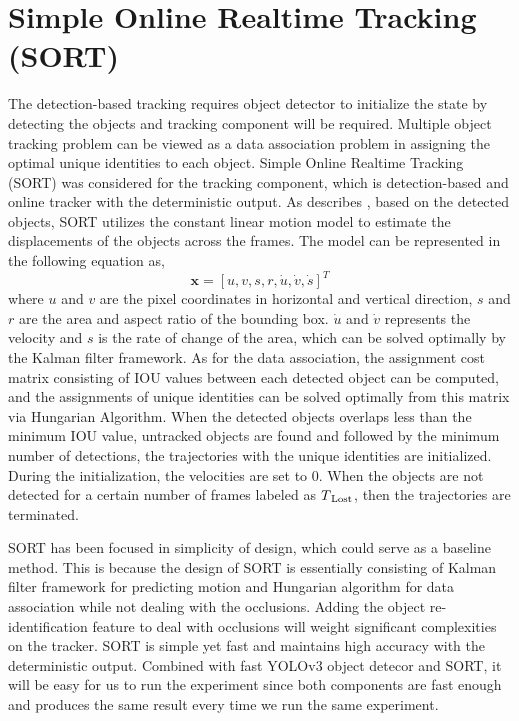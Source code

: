 \section{Simple Online Realtime Tracking (SORT)}
\label{sec:background/section_b}

The detection-based tracking requires object detector to initialize the state by detecting the objects and tracking component will be required. Multiple object tracking problem can be viewed as a data association problem in assigning the optimal unique identities to each object. Simple Online Realtime Tracking (SORT) was considered for the tracking component, which is detection-based and online tracker with the deterministic output. As \citeauthor{bewley_simple_2016} describes \cite{bewley_simple_2016}, based on the detected objects, SORT utilizes the constant linear motion model to estimate the displacements of the objects across the frames. The model can be represented in the following equation as,
\begin{equation}
\textbf{x} = [u, v, s, r, \dot{u}, \dot{v}, \dot{s}]^T
\label{eq:SORT_model}
\end{equation}
where $u$ and $v$ are the pixel coordinates in horizontal and vertical direction, $s$ and $r$ are the area and aspect ratio of the bounding box. $\dot{u}$ and $\dot{v}$ represents the velocity and $s$ is the rate of change of the area, which can be solved optimally by the Kalman filter framework. As for the data association, the assignment cost matrix consisting of IOU values between each detected object can be computed, and the assignments of unique identities can be solved optimally from this matrix via Hungarian Algorithm. When the detected objects overlaps less than the minimum IOU value, untracked objects are found and followed by the minimum number of detections, the trajectories with the unique identities are initialized. During the initialization, the velocities are set to 0. When the objects are not detected for a certain number of frames labeled as $T\textsubscript{Lost}$, then the trajectories are terminated.

SORT has been focused in simplicity of design, which could serve as a baseline method. This is because the design of SORT is essentially consisting of Kalman filter framework for predicting motion and Hungarian algorithm for data association while not dealing with the occlusions. Adding the object re-identification feature to deal with occlusions will weight significant complexities on the tracker. SORT is simple yet fast and maintains high accuracy with the deterministic output. Combined with fast YOLOv3 object detecor and SORT, it will be easy for us to run the experiment since both components are fast enough and produces the same result every time we run the same experiment.